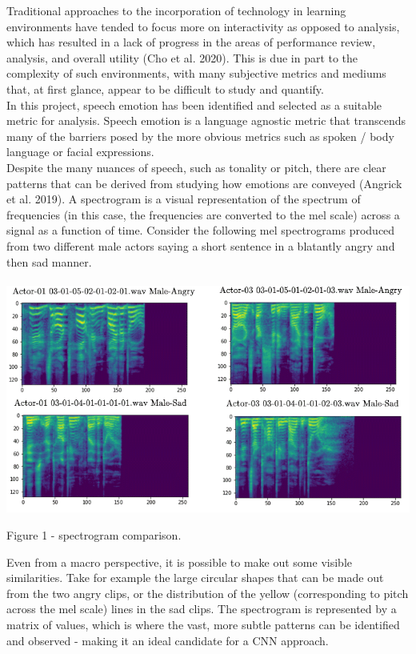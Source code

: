 \documentclass[12pt]{article}
\begin{document}
\noindent Traditional approaches to the incorporation of technology in learning environments have tended to focus more on interactivity as opposed to analysis, which has resulted in a lack of progress in the areas of performance review, analysis, and overall utility (Cho et al. 2020). This is due in part to the complexity of such environments, with many subjective metrics and mediums that, at first glance, appear to be difficult to study and quantify.
\\

\noindent In this project, speech emotion has been identified and selected as a suitable metric for analysis. Speech emotion is a language agnostic metric that transcends many of the barriers posed by the more obvious metrics such as spoken / body language or facial expressions.
\\

\noindent Despite the many nuances of speech, such as tonality or pitch, there are clear patterns that can be derived from studying how emotions are conveyed (Angrick et al. 2019). A spectrogram is a visual representation of the spectrum of frequencies (in this case, the frequencies are converted to the mel scale) across a signal as a function of time. Consider the following mel spectrograms produced from two different male actors saying a short sentence in a blatantly angry and then sad manner.
\\
\\
\includegraphics[width=14cm]{figure_1_spectrogram_comparison}

\noindent Figure 1 - spectrogram comparison.
\vspace{0.05cm}

\noindent Even from a macro perspective, it is possible to make out some visible similarities. Take for example the large circular shapes that can be made out from the two angry clips, or the distribution of the yellow (corresponding to pitch across the mel scale) lines in the sad clips. The spectrogram is represented by a matrix of values, which is where the vast, more subtle patterns can be identified and observed - making it an ideal candidate for a CNN approach.
\end{document}
